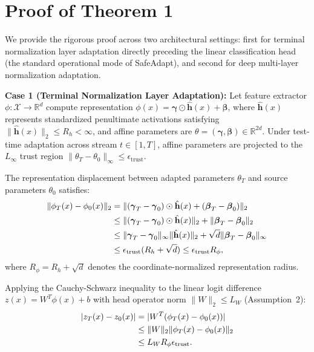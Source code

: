 \documentclass[journal]{IEEEtran}
\begin{document}
\section{Proof of Theorem 1}
\label{app:theorem1_proof}
\begin{IEEEproof}
We provide the rigorous proof across two architectural settings: first for terminal normalization layer adaptation directly preceding the linear classification head (the standard operational mode of SafeAdapt), and second for deep multi-layer normalization adaptation.

\textbf{Case 1 (Terminal Normalization Layer Adaptation):}
Let feature extractor $\phi: \mathcal{X} \to \mathbb{R}^d$ compute representation $\phi(x) = \boldsymbol{\gamma} \odot \hat{\mathbf{h}}(x) + \boldsymbol{\beta}$, where $\hat{\mathbf{h}}(x)$ represents standardized penultimate activations satisfying $\|\hat{\mathbf{h}}(x)\|_2 \le R_h < \infty$, and affine parameters are $\theta = (\boldsymbol{\gamma}, \boldsymbol{\beta}) \in \mathbb{R}^{2d}$. Under test-time adaptation across stream $t \in [1, T]$, affine parameters are projected to the $L_\infty$ trust region $\|\theta_T - \theta_0\|_\infty \le \epsilon_{\mathrm{trust}}$.

The representation displacement between adapted parameters $\theta_T$ and source parameters $\theta_0$ satisfies:
\begin{align}
\|\phi_T(x) - \phi_0(x)\|_2 &= \|(\boldsymbol{\gamma}_T - \boldsymbol{\gamma}_0) \odot \hat{\mathbf{h}}(x) + (\boldsymbol{\beta}_T - \boldsymbol{\beta}_0)\|_2 \notag \\
&\le \|(\boldsymbol{\gamma}_T - \boldsymbol{\gamma}_0) \odot \hat{\mathbf{h}}(x)\|_2 + \|\boldsymbol{\beta}_T - \boldsymbol{\beta}_0\|_2 \notag \\
&\le \|\boldsymbol{\gamma}_T - \boldsymbol{\gamma}_0\|_\infty \|\hat{\mathbf{h}}(x)\|_2 + \sqrt{d} \|\boldsymbol{\beta}_T - \boldsymbol{\beta}_0\|_\infty \notag \\
&\le \epsilon_{\mathrm{trust}} (R_h + \sqrt{d}) \le \epsilon_{\mathrm{trust}} R_\phi,
\end{align}
where $R_\phi = R_h + \sqrt{d}$ denotes the coordinate-normalized representation radius.

Applying the Cauchy-Schwarz inequality to the linear logit difference $z(x) = W^T \phi(x) + b$ with head operator norm $\|W\|_2 \le L_W$ (Assumption~2):
\begin{align}
|z_T(x) - z_0(x)| &= |W^T (\phi_T(x) - \phi_0(x))| \notag \\
&\le \|W\|_2 \|\phi_T(x) - \phi_0(x)\|_2 \notag \\
&\le L_W R_\phi \epsilon_{\mathrm{trust}}.
\end{align}


\end{IEEEproof}
\end{document}
